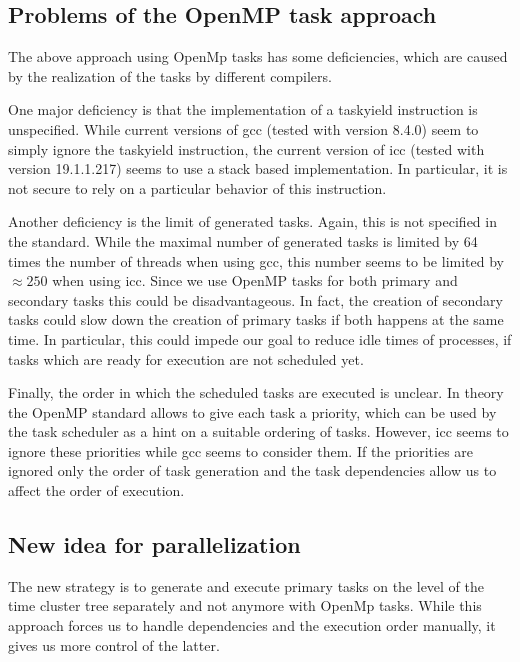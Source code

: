 \documentclass[a4paper,11pt]{article}
\theoremstyle{plain}
\theoremstyle{definition}
\theoremstyle{remark}
\begin{document}
\subsection{Problems of the OpenMP task approach}
The above approach using OpenMp tasks has some deficiencies, which are caused by the realization of the tasks by different compilers. 

One major deficiency is that the implementation of a taskyield instruction is unspecified. While current versions of gcc (tested with version 8.4.0) seem to simply ignore the taskyield instruction, the current version of icc (tested with version 19.1.1.217) seems to use a stack based implementation. In particular, it is not secure to rely on a particular behavior of this instruction. 

Another deficiency is the limit of generated tasks. Again, this is not specified in the standard. While the maximal number of generated tasks is limited by 64 times the number of threads when using gcc, this number seems to be limited by $\approx 250$ when using icc. Since we use OpenMP tasks for both primary and secondary tasks this could be disadvantageous. In fact, the creation of secondary tasks could slow down the creation of primary tasks if both happens at the same time. In particular, this could impede our goal to reduce idle times of processes, if tasks which are ready for execution are not scheduled yet.  

Finally, the order in which the scheduled tasks are executed is unclear. In theory the OpenMP standard allows to give each task a priority, which can be used by the task scheduler as a hint on a suitable ordering of tasks. However, icc seems to ignore these priorities while gcc seems to consider them. If the priorities are ignored only the order of task generation and the task dependencies allow us to affect the order of execution.

\subsection{New idea for parallelization}
The new strategy is to generate and execute primary tasks on the level of the time cluster tree separately and not anymore with OpenMp tasks. While this approach forces us to handle dependencies and the execution order manually, it gives us more control of the latter.
\end{document}
